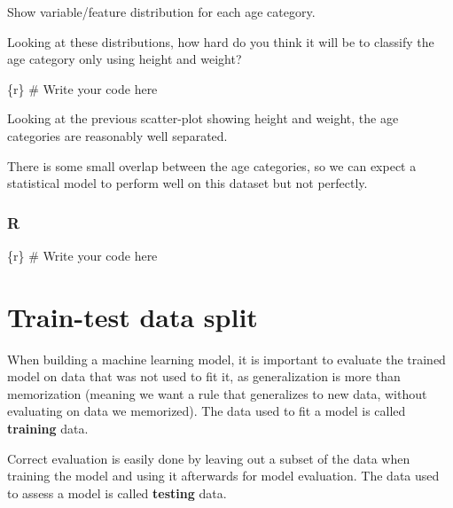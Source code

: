 \documentclass[
  letterpaper,
  DIV=11,
  numbers=noendperiod,
  oneside]{scrreprt}
\newenvironment{Shaded}{\begin{snugshade}}{\end{snugshade}}
\newcommand{\CommentTok}[1]{\textcolor[rgb]{0.37,0.37,0.37}{#1}}
\newcommand{\InformationTok}[1]{\textcolor[rgb]{0.37,0.37,0.37}{#1}}
\begin{document}
Show variable/feature distribution for each age category.

Looking at these distributions, how hard do you think it will be to
classify the age category only using height and weight?

\begin{Shaded}
\begin{Highlighting}[]
\InformationTok{\textasciigrave{}\textasciigrave{}\textasciigrave{}\{r\}}
\CommentTok{\# Write your code here}
\InformationTok{\textasciigrave{}\textasciigrave{}\textasciigrave{}}
\end{Highlighting}
\end{Shaded}

Looking at the previous scatter-plot showing height and weight, the age
categories are reasonably well separated.

There is some small overlap between the age categories, so we can expect
a statistical model to perform well on this dataset but not perfectly.

\hypertarget{r-15}{%
\subsubsection{R}\label{r-15}}

\begin{Shaded}
\begin{Highlighting}[]
\InformationTok{\textasciigrave{}\textasciigrave{}\textasciigrave{}\{r\}}
\CommentTok{\# Write your code here}
\InformationTok{\textasciigrave{}\textasciigrave{}\textasciigrave{}}
\end{Highlighting}
\end{Shaded}

\hypertarget{train-test-data-split}{%
\section{Train-test data split}\label{train-test-data-split}}

When building a machine learning model, it is important to evaluate the
trained model on data that was not used to fit it, as generalization is
more than memorization (meaning we want a rule that generalizes to new
data, without evaluating on data we memorized). The data used to fit a
model is called \textbf{training} data.

Correct evaluation is easily done by leaving out a subset of the data
when training the model and using it afterwards for model evaluation.
The data used to assess a model is called \textbf{testing} data.
\end{document}
